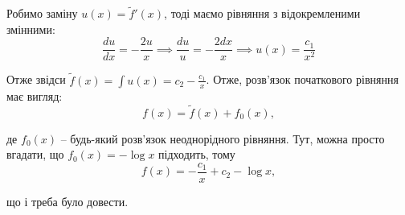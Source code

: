 \documentclass[14pt]{extarticle}
\newcommand{\<}{\langle}
\renewcommand{\>}{\rangle}
\theoremstyle{mystyle}{\newtheorem{definition}{Definition}[section]}
\theoremstyle{mystyle}{\newtheorem{proposition}[definition]{Proposition}}
\theoremstyle{mystyle}{\newtheorem{theorem}[definition]{Theorem}}
\theoremstyle{mystyle}{\newtheorem{lemma}[definition]{Lemma}}
\theoremstyle{mystyle}{\newtheorem{corollary}[definition]{Corollary}}
\theoremstyle{mystyle}{\newtheorem*{remark}{Remark}}
\theoremstyle{mystyle}{\newtheorem*{remarks}{Remarks}}
\theoremstyle{mystyle}{\newtheorem*{example}{Example}}
\theoremstyle{mystyle}{\newtheorem*{examples}{Examples}}
\theoremstyle{definition}{\newtheorem*{exercise}{Exercise}}
\theoremstyle{cstyle}{\newtheorem*{cthm}{}}
\theoremstyle{warn}
\begin{document}
Робимо заміну $u(x)=\widetilde{f}'(x)$, тоді маємо рівняння з відокремленими змінними:
\begin{equation}
    \frac{du}{dx} = -\frac{2u}{x} \implies \frac{du}{u} = -\frac{2dx}{x} \implies u(x) = \frac{c_1}{x^2}
\end{equation}

Отже звідси $\widetilde{f}(x) = \int u(x) = c_2-\frac{c_1}{x}$. Отже, розв'язок початкового рівняння має вигляд:
\begin{equation}
    f(x) = \widetilde{f}(x) + f_0(x),
\end{equation}

де $f_0(x)$ -- будь-який розв'язок неоднорідного рівняння. Тут, можна просто вгадати, що $f_0(x)=-\log x$ підходить, тому
\begin{equation}
    f(x) = -\frac{c_1}{x} + c_2 - \log x,
\end{equation}

що і треба було довести.
\end{document}

